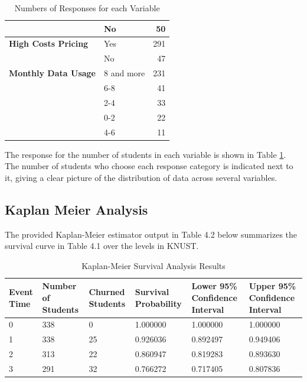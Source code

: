 \documentclass[doublespacing,12pt]{report}
\begin{document}
\begin{table}[H]
\begin{tabular}{llr}
                                                 & No & 50 \\
        \midrule
        \textbf{High Costs Pricing} & Yes & 291 \\
                                     & No & 47 \\
        \midrule
        \textbf{Monthly Data Usage} & 8 and more & 231 \\
                                    & 6-8 & 41 \\
                                    & 2-4 & 33 \\
                                    & 0-2 & 22 \\
                                    & 4-6 & 11 \\
        \bottomrule

    \end{tabular}
    \caption{Numbers of Responses for each Variable}
    \label{tab: description}
\end{table}
\noindent The response for the number of students in each variable is shown in Table \ref{tab: description}. The number of students who choose each response category is indicated next to it, giving a clear picture of the distribution of data across several variables.




\subsection{Kaplan Meier Analysis}

The provided Kaplan-Meier estimator output in Table 4.2 below summarizes the survival curve in Table 4.1 over the levels in KNUST.


\begin{table}[H]
\centering
\begin{tabularx}{\textwidth}{lXXXXX}
\toprule
Event Time & Number of Students & Churned Students & Survival Probability & Lower 95\% Confidence Interval & Upper 95\% Confidence Interval \\
\midrule
0 & 338 & 0 & 1.000000 & 1.000000 & 1.000000 \\
1 & 338 & 25 & 0.926036 & 0.892497 & 0.949406 \\
2 & 313 & 22 & 0.860947 & 0.819283 & 0.893630 \\
3 & 291 & 32 & 0.766272 & 0.717405 & 0.807836 \\ 
\bottomrule
\end{tabularx}
\caption{Kaplan-Meier Survival Analysis Results}
\label{tab:km_results}
\end{table}
\end{document}
